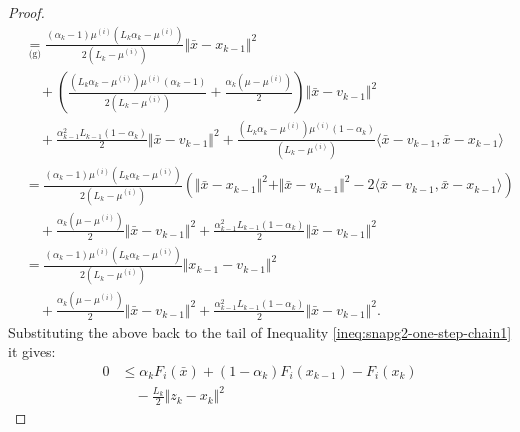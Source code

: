 \documentclass[12pt]{article}
\begin{document}
\begin{proof}
{\begin{align*}
                & \underset{\text{(g)}}{=} 
                \frac{(\alpha_k - 1)\mu^{(i)}\left(L_k\alpha_k - \mu^{(i)}\right)}
                {2\left(L_k - \mu^{(i)}\right)}\Vert \bar x - x_{k - 1}\Vert^2
                    \\ &\quad 
                    + \left(
                        \frac{
                            \left(L_k \alpha_k - \mu^{(i)}\right)\mu^{(i)}
                            \left(\alpha_k - 1\right)
                        }
                        {2(L_k - \mu^{(i)})}
                        + \frac{\alpha_k(\mu - \mu^{(i)})}{2}
                    \right) \Vert \bar x - v_{k - 1}\Vert^2
                    \\ &\quad 
                    + \frac{\alpha_{k - 1}^2L_{k - 1}(1 - \alpha_k)}{2} \Vert \bar x - v_{k - 1}\Vert^2
                    + \frac{(L_k\alpha_k  - \mu^{(i)})\mu^{(i)}(1 - \alpha_k)}{(L_k - \mu^{(i)})}\langle \bar x - v_{k - 1}, \bar x - x_{k - 1}\rangle
                \\
                &= 
                \frac{(\alpha_k - 1)\mu^{(i)}\left(L_k\alpha_k - \mu^{(i)}\right)}{2\left(L_k - \mu^{(i)}\right)}\left(
                    \Vert \bar x - x_{k - 1}\Vert^2 + \Vert \bar x - v_{k - 1}\Vert^2 - 2\langle \bar x - v_{k - 1}, \bar x - x_{k - 1}\rangle
                \right) 
                    \\ &\quad 
                    + \frac{\alpha_k(\mu - \mu^{(i)})}{2} \Vert \bar x - v_{k - 1}\Vert^2
                    + \frac{\alpha_{k - 1}^2L_{k - 1}(1 - \alpha_k)}{2} \Vert \bar x - v_{k - 1}\Vert^2
                \\
                &= \frac{(\alpha_k - 1)\mu^{(i)}\left(L_k\alpha_k - \mu^{(i)}\right)}{2\left(L_k - \mu^{(i)}\right)}
                    \Vert x_{k - 1} - v_{k - 1} \Vert^2
                    \\ &\quad 
                    + \frac{\alpha_k(\mu - \mu^{(i)})}{2} \Vert \bar x - v_{k - 1}\Vert^2
                    + \frac{\alpha_{k - 1}^2L_{k - 1}(1 - \alpha_k)}{2} \Vert \bar x - v_{k - 1}\Vert^2.
            \end{align*}
            }
            Substituting the above back to the tail of Inequality \eqref{ineq:snapg2-one-step-chain1} it gives: 
            {\allowdisplaybreaks
            \begin{align*}
                0 &\le 
                \alpha_k F_i(\bar x) + (1 - \alpha_k)F_i(x_{k - 1}) - F_i(x_k) 
                    \\&\quad 
                    - \frac{L_k}{2}\Vert z_k - x_k\Vert^2 

\end{align*}}
\end{proof}
\end{document}
